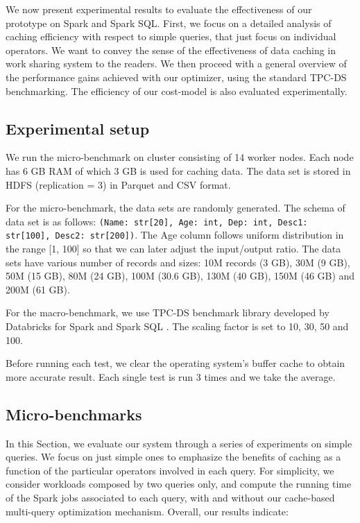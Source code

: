 We now present experimental results to evaluate the effectiveness of our prototype on Spark and Spark SQL. First, we focus on a detailed analysis of caching efficiency with respect to simple queries, that just focus on individual operators. We want to convey the sense of the effectiveness of data caching in work sharing system to the readers. We then proceed with a general overview of the performance gains achieved with our optimizer, using the standard TPC-DS benchmarking. The efficiency of our cost-model is also evaluated experimentally.

\subsection{Experimental setup}
\label{sec:setup}
%
We run the micro-benchmark on cluster consisting of 14 worker nodes. Each node has 6 GB RAM of which 3 GB is used for caching data. The data set is stored in HDFS (replication = 3) in Parquet and CSV format. 

For the micro-benchmark, the data sets are randomly generated. The schema of data set is as follows: \texttt{(Name: str[20], Age: int, Dep: int, Desc1: str[100], Desc2: str[200])}. The Age column follows uniform distribution in the range [1, 100] so that we can later adjust the input/output ratio. The data sets have various number of records and sizes: 10M records (3 GB), 30M (9 GB), 50M (15 GB), 80M (24 GB), 100M (30.6 GB), 130M (40 GB), 150M (46 GB) and 200M (61 GB).

For the macro-benchmark, we use TPC-DS benchmark library developed by Databricks for Spark and Spark SQL \cite{sparksqlperf}. The scaling factor is set to 10, 30, 50 and 100.

Before running each test, we clear the operating system's buffer cache to obtain more accurate result. Each single test is run 3 times and we take the average.

\subsection{Micro-benchmarks}
\label{sec:micro}
In this Section, we evaluate our system through a series of experiments on simple queries. We focus on just simple ones to emphasize the benefits of caching as a function of the particular operators involved in each query. For simplicity, we consider workloads composed by two queries only, and compute the running time of the Spark jobs associated to each query, with and without our cache-based multi-query optimization mechanism. Overall, our results indicate:

